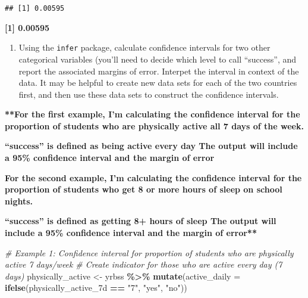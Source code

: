 \documentclass[
]{article}
\newenvironment{Shaded}{\begin{snugshade}}{\end{snugshade}}
\newcommand{\AttributeTok}[1]{\textcolor[rgb]{0.13,0.29,0.53}{#1}}
\newcommand{\CommentTok}[1]{\textcolor[rgb]{0.56,0.35,0.01}{\textit{#1}}}
\newcommand{\FunctionTok}[1]{\textcolor[rgb]{0.13,0.29,0.53}{\textbf{#1}}}
\newcommand{\NormalTok}[1]{#1}
\newcommand{\OtherTok}[1]{\textcolor[rgb]{0.56,0.35,0.01}{#1}}
\newcommand{\SpecialCharTok}[1]{\textcolor[rgb]{0.81,0.36,0.00}{\textbf{#1}}}
\newcommand{\StringTok}[1]{\textcolor[rgb]{0.31,0.60,0.02}{#1}}
\providecommand{\tightlist}{%
  \setlength{\itemsep}{0pt}\setlength{\parskip}{0pt}}
\begin{document}
\begin{verbatim}
## [1] 0.00595
\end{verbatim}

\textbf{{[}1{]} 0.00595}

\begin{enumerate}
\def\labelenumi{\arabic{enumi}.}
\setcounter{enumi}{3}
\tightlist
\item
  Using the \texttt{infer} package, calculate confidence intervals for
  two other categorical variables (you'll need to decide which level to
  call ``success'', and report the associated margins of error. Interpet
  the interval in context of the data. It may be helpful to create new
  data sets for each of the two countries first, and then use these data
  sets to construct the confidence intervals.
\end{enumerate}

\textbf{**For the first example, I'm calculating the confidence interval
for the proportion of students who are physically active all 7 days of
the week.}

\textbf{``success'' is defined as being active every day The output will
include a 95\% confidence interval and the margin of error}

\textbf{For the second example, I'm calculating the confidence interval
for the proportion of students who get 8 or more hours of sleep on
school nights.}

\textbf{``success'' is defined as getting 8+ hours of sleep The output
will include a 95\% confidence interval and the margin of error**}

\begin{Shaded}
\begin{Highlighting}[]
\CommentTok{\# Example 1: Confidence interval for proportion of students who are physically active 7 days/week}
\CommentTok{\# Create indicator for those who are active every day (7 days)}
\NormalTok{physically\_active }\OtherTok{\textless{}{-}}\NormalTok{ yrbss }\SpecialCharTok{\%\textgreater{}\%}
  \FunctionTok{mutate}\NormalTok{(}\AttributeTok{active\_daily =} \FunctionTok{ifelse}\NormalTok{(physically\_active\_7d }\SpecialCharTok{==} \StringTok{"7"}\NormalTok{, }\StringTok{"yes"}\NormalTok{, }\StringTok{"no"}\NormalTok{))}
\end{Highlighting}
\end{Shaded}
\end{document}
